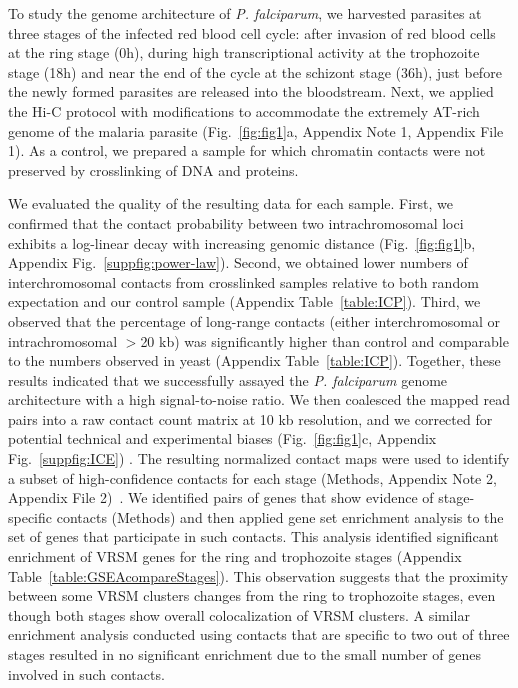 To study the genome architecture of {\em P. falciparum}, we harvested
parasites at three stages of the infected red blood cell cycle: after invasion
of red blood cells at the ring stage (0h), during high transcriptional
activity at the trophozoite stage (18h) and near the end of the cycle at the
schizont stage (36h), just before the newly formed parasites are released into
the bloodstream. Next, we applied the Hi-C protocol \citep{kalhor:genome} with
modifications to accommodate the extremely AT-rich genome of the malaria
parasite (Fig.~\ref{fig:fig1}a, Appendix Note 1, Appendix File 1).
As a control, we prepared a sample for which chromatin contacts were not
preserved by crosslinking of DNA and proteins.

We evaluated the quality of the resulting data for each sample. First, we
confirmed that the contact probability between two intrachromosomal loci
exhibits a log-linear decay with increasing genomic distance
(Fig.~\ref{fig:fig1}b, Appendix Fig.~\ref{suppfig:power-law}). Second,
we obtained lower numbers of interchromosomal contacts from crosslinked
samples relative to both random expectation and our control sample
(Appendix Table~\ref{table:ICP}). Third, we observed that the percentage
of long-range contacts (either interchromosomal or intrachromosomal $>$20 kb)
was significantly higher than control and comparable to the numbers observed
in yeast \citep{duan:three} (Appendix Table~\ref{table:ICP}). Together,
these results indicated that we successfully assayed the {\em P. falciparum}
genome architecture with a high signal-to-noise ratio. We then coalesced the
mapped read pairs into a raw contact count matrix at 10 kb resolution, and we
corrected for potential technical and experimental biases
\citep{imakaev:iterative} (Fig.~\ref{fig:fig1}c, Appendix
Fig.~\ref{suppfig:ICE}) . The resulting normalized contact maps were used to
identify a subset of high-confidence contacts for each stage (Methods,
Appendix Note 2, Appendix File 2)~\citep{ay:statistical}. We
identified pairs of genes that show evidence of stage-specific contacts
(Methods) and then applied gene set enrichment analysis to the set of genes
that participate in such contacts.  This analysis identified significant
enrichment of VRSM genes for the ring and trophozoite stages (Appendix
Table~\ref{table:GSEAcompareStages}). This observation suggests that the
proximity between some VRSM clusters changes from the ring to trophozoite
stages, even though both stages show overall colocalization of VRSM clusters.
A similar enrichment analysis conducted using contacts that are specific to
two out of three stages resulted in no significant enrichment due to the small
number of genes involved in such contacts.

